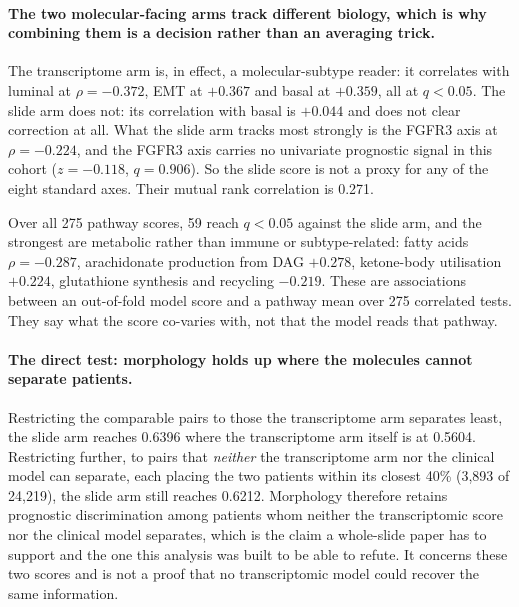 \documentclass[11pt]{article}
\begin{document}
\paragraph{The two molecular-facing arms track different biology, which is why combining them is a
decision rather than an averaging trick.} The transcriptome arm is, in effect, a molecular-subtype
reader: it correlates with luminal at $\rho=-0.372$, EMT at $+0.367$ and basal at $+0.359$, all at
$q<0.05$. The slide arm does not: its correlation with basal is $+0.044$ and does not clear
correction at all. What the slide arm tracks most strongly is the FGFR3 axis at $\rho=-0.224$, and the FGFR3 axis carries no univariate prognostic signal in this cohort ($z=-0.118$,
$q=0.906$). So the slide score is not a proxy for any of the eight standard axes. Their mutual rank
correlation is 0.271.

Over all 275 pathway scores, 59 reach $q<0.05$ against the slide arm, and the strongest are
metabolic rather than immune or subtype-related: fatty acids $\rho=-0.287$, arachidonate production
from DAG $+0.278$, ketone-body utilisation $+0.224$, glutathione synthesis and recycling $-0.219$.
These are associations between an out-of-fold model score and a pathway mean over 275 correlated
tests. They say what the score co-varies with, not that the model reads that pathway.

\paragraph{The direct test: morphology holds up where the molecules cannot separate patients.}
Restricting the comparable pairs to those the transcriptome arm separates least, the slide arm
reaches 0.6396 where the transcriptome arm itself is at 0.5604. Restricting further, to
pairs that \emph{neither} the transcriptome arm nor the clinical model can separate, each placing
the two patients within its closest 40\% (3{,}893 of 24{,}219), the slide arm still reaches 0.6212.
Morphology therefore retains prognostic discrimination among patients whom neither the
transcriptomic score nor the clinical model separates, which is the claim a
whole-slide paper has to support and the one this analysis was built to be able to refute. It
concerns these two scores and is not a proof that no transcriptomic model could recover the same
information.
\end{document}
